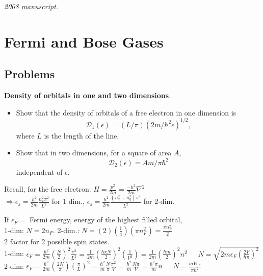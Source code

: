 \noindent\textit{2008 manuscript.}

\section{Fermi and Bose Gases}

\subsection*{Problems}

 \textbf{Density of orbitals in one and two dimensions}.  \begin{itemize} \item[(a)] Show that the density of orbitals of a free electron in one dimension is 
\begin{equation}
  \mathcal{D}_1(\epsilon) = (L/\pi)(2 m/ \hbar^2 \epsilon)^{1/2},
\end{equation}
where $L$ is the length of the line.  \item[(b)] Show that in two dimensions, for a square of area $A$, 
\begin{equation}
  \mathcal{D}_2(\epsilon) = A m /\pi \hbar^2
\end{equation}
independent of $\epsilon$.  
\end{itemize}

 Recall, for the free electron: $H = \frac{p^2}{2m} = \frac{-\hbar^2}{2m} \nabla^2$ \\
$\Longrightarrow \epsilon_s = \frac{ \hbar^2}{2m} \frac{n_x^2 \pi^2}{L^2}$ for 1 dim., $\epsilon_s = \frac{\hbar^2}{2m} \frac{ (n_x^2 + n_y^2 ) \pi^2 }{L^2}$ for 2-dim.  

If $\epsilon_F = $ Fermi energy, energy of the highest filled orbital,  \\
1-dim: $N = 2n_F$.  2-dim.: $N = (2) \left( \frac{1}{4} \right) (\pi n_F^2) = \frac{ \pi n_F^2}{2}$   \\
2 factor for 2 possible spin states.  \\


1-dim: $\epsilon_F = \frac{ \hbar^2}{2m} \left( \frac{ N}{2} \right)^2 \frac{ \pi^2 }{L^2} = \frac{1}{2m} \left( \frac{  \hbar \pi N}{2} \right)^2 \left( \frac{1}{V^2} \right) = \frac{1}{2m} \left( \frac{ \hbar m}{2} \right)^2 n^2 $ $\quad \, N = \sqrt{ 2 m \epsilon_F \left( \frac{2 V}{\hbar \pi } \right)^2} $   \\
2-dim: $\epsilon_F = \frac{ \hbar^2}{2m} \left( \frac{ 2N }{\pi} \right) \left( \frac{\pi}{L} \right)^2 = \frac{ \hbar^2 }{m} \frac{N}{\pi} \frac{\pi^2}{V} = \frac{ \hbar^2}{m} \frac{N \pi }{V} = \frac{\hbar^2 \pi}{m} n$ $\quad \,  N = \frac{ mV \epsilon_F}{ \pi \hbar^2} $ \\


